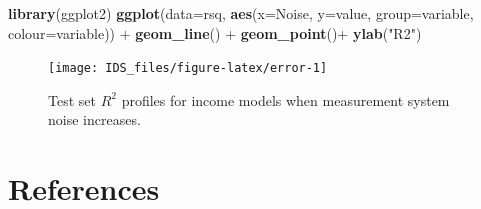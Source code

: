 \documentclass[12pt,]{krantz}
\newenvironment{Shaded}{\begin{snugshade}}{\end{snugshade}}
\newcommand{\KeywordTok}[1]{\textcolor[rgb]{0.13,0.29,0.53}{\textbf{{#1}}}}
\newcommand{\DataTypeTok}[1]{\textcolor[rgb]{0.13,0.29,0.53}{{#1}}}
\newcommand{\StringTok}[1]{\textcolor[rgb]{0.31,0.60,0.02}{{#1}}}
\newcommand{\NormalTok}[1]{{#1}}
\theoremstyle{definition}
\theoremstyle{definition}
\theoremstyle{remark}
\begin{document}
\begin{Shaded}
\begin{Highlighting}[]
\KeywordTok{library}\NormalTok{(ggplot2)}
\KeywordTok{ggplot}\NormalTok{(}\DataTypeTok{data=}\NormalTok{rsq, }\KeywordTok{aes}\NormalTok{(}\DataTypeTok{x=}\NormalTok{Noise, }\DataTypeTok{y=}\NormalTok{value, }\DataTypeTok{group=}\NormalTok{variable, }\DataTypeTok{colour=}\NormalTok{variable)) +}
\StringTok{    }\KeywordTok{geom_line}\NormalTok{() +}
\StringTok{    }\KeywordTok{geom_point}\NormalTok{()+}
\StringTok{  }\KeywordTok{ylab}\NormalTok{(}\StringTok{"R2"}\NormalTok{) }
\end{Highlighting}
\end{Shaded}

\begin{figure}

{\centering \texttt{[image: IDS\_files/figure-latex/error-1]} 

}

\caption{Test set $R^2$ profiles for income models when measurement system noise increases. }\label{fig:error}
\end{figure}

\chapter{References}\label{references}



\backmatter
\printindex
\end{document}
